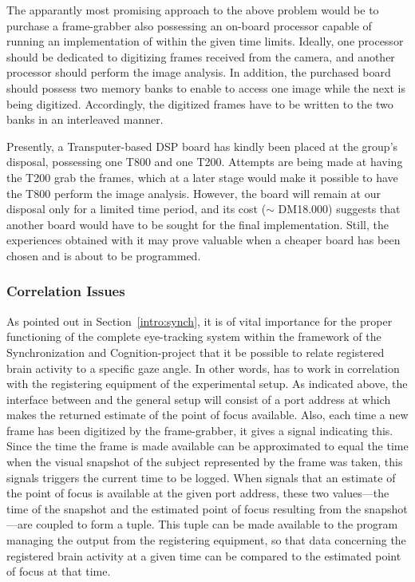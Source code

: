 The apparantly most promising approach to the above problem would be
to purchase a frame-grabber also possessing an on-board processor
capable of running an implementation of {\octopus} within the given
time limits.  Ideally, one processor should be dedicated to digitizing
frames received from the camera, and another processor should perform
the image analysis.  In addition, the purchased board should possess
two memory banks to enable {\octopus} to access one image while the
next is being digitized.  Accordingly, the digitized frames have to be
written to the two banks in an interleaved manner.  

Presently, a Transputer-based DSP board has kindly been placed at the
group's disposal, possessing one T800 and one T200.  Attempts are
being made at having the T200 grab the frames, which at a later stage
would make it possible to have the T800 perform the image analysis.
However, the board will remain at our disposal only for a limited time
period, and its cost ($\sim$ DM18.000) suggests that another board
would have to be sought for the final implementation.  Still, the
experiences obtained with it may prove valuable when a cheaper board
has been chosen and is about to be programmed.

\subsubsection{Correlation Issues}

As pointed out in Section~\ref{intro:synch}, it is of vital importance
for the proper functioning of the complete eye-tracking system within
the framework of the Synchronization and Cognition-project that it be
possible to relate registered brain activity to a specific gaze angle.
In other words, {\octopus} has to work in correlation with the
registering equipment of the experimental setup.  As indicated above,
the interface between {\octopus} and the general setup will consist of
a port address at which {\octopus} makes the returned estimate of the
point of focus available.  Also, each time a new frame has been
digitized by the frame-grabber, it gives a signal indicating this.
Since the time the frame is made available can be approximated to
equal the time when the visual snapshot of the subject represented by
the frame was taken, this signals triggers the current time to be
logged.  When {\octopus} signals that an estimate of the point of
focus is available at the given port address, these two values---the
time of the snapshot and the estimated point of focus resulting from
the snapshot---are coupled to form a tuple.  This tuple can be made
available to the program managing the output from the registering
equipment, so that data concerning the registered brain activity at a
given time can be compared to the estimated point of focus at that
time.
